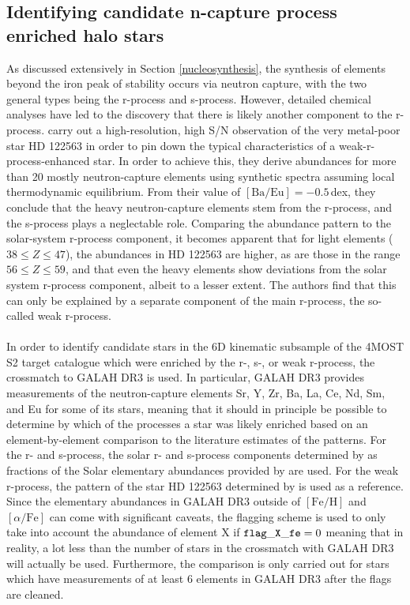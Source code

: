 \documentclass[a4paper,11pt]{article}
\begin{document}
\subsection{Identifying candidate n-capture process enriched halo stars}\label{candidate_ncapture}
As discussed extensively in Section \ref{nucleosynthesis}, the synthesis of elements beyond the iron peak of stability occurs via neutron capture, with the two general types being the r-process and s-process. However, detailed chemical analyses have led to the discovery that there is likely another component to the r-process. \citet{honda06} carry out a high-resolution, high S/N observation of the very metal-poor star HD 122563 in order to pin down the typical characteristics of a weak-r-process-enhanced star. In order to achieve this, they derive abundances for more than 20 mostly neutron-capture elements using synthetic spectra assuming local thermodynamic equilibrium. From their value of $\mathrm{[Ba/Eu]} = -0.5$\,dex, they conclude that the heavy neutron-capture elements stem from the r-process, and the s-process plays a neglectable role. Comparing the abundance pattern to the solar-system r-process component, it becomes apparent that for light elements ($38\leq Z\leq47$), the abundances in HD 122563 are higher, as are those in the range $56\leq Z\leq59$, and that even the heavy elements show deviations from the solar system r-process component, albeit to a lesser extent. The authors find that this can only be explained by a separate component of the main r-process, the so-called weak r-process.\\ \\
%
In order to identify candidate stars in the 6D kinematic subsample of the 4MOST S2 target catalogue which were enriched by the r-, s-, or weak r-process, the crossmatch to GALAH DR3 is used. In particular, GALAH DR3 provides measurements of the neutron-capture elements Sr, Y, Zr, Ba, La, Ce, Nd, Sm, and Eu for some of its stars, meaning that it should in principle be possible to determine by which of the processes a star was likely enriched based on an element-by-element comparison to the literature estimates of the patterns. For the r- and s-process, the solar r- and s-process components determined by \citet[][Table 4]{prantzos20} as fractions of the Solar elementary abundances provided by \citet{lodders09} are used. For the weak r-process, the pattern of the star HD 122563 determined by \citet{honda06} is used as a reference. Since the elementary abundances in GALAH DR3 outside of $\mathrm{[Fe/H]}$ and $[\alpha/\mathrm{Fe}]$ can come with significant caveats, the flagging scheme is used to only take into account the abundance of element X if ${\tt flag\_X\_fe}=0$ meaning that in reality, a lot less than the number of stars in the crossmatch with GALAH DR3 will actually be used. Furthermore, the comparison is only carried out for stars which have measurements of at least 6 elements in GALAH DR3 after the flags are cleaned.\\ \\
\end{document}
